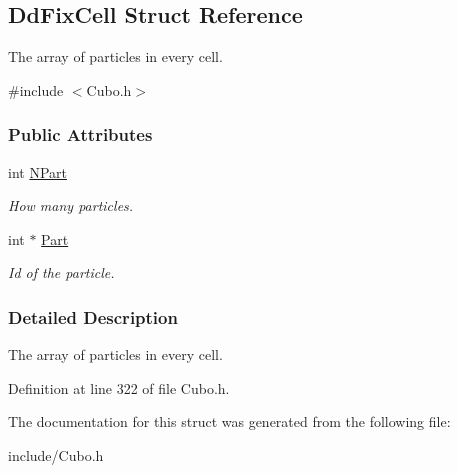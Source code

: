 \hypertarget{structDdFixCell}{}\subsection{Dd\+Fix\+Cell Struct Reference}
\label{structDdFixCell}


The array of particles in every cell.  




{\ttfamily \#include $<$Cubo.\+h$>$}

\subsubsection*{Public Attributes}
\begin{DoxyCompactItemize}
\item 
int \hyperlink{structDdFixCell_abdcc792391d8c5092471dff191de47f4}{N\+Part}\hypertarget{structDdFixCell_abdcc792391d8c5092471dff191de47f4}{}\label{structDdFixCell_abdcc792391d8c5092471dff191de47f4}

\begin{DoxyCompactList}\small\item\em How many particles. \end{DoxyCompactList}\item 
int $\ast$ \hyperlink{structDdFixCell_a9beee0152293e683562b0dccaa209270}{Part}\hypertarget{structDdFixCell_a9beee0152293e683562b0dccaa209270}{}\label{structDdFixCell_a9beee0152293e683562b0dccaa209270}

\begin{DoxyCompactList}\small\item\em Id of the particle. \end{DoxyCompactList}\end{DoxyCompactItemize}


\subsubsection{Detailed Description}
The array of particles in every cell. 

Definition at line 322 of file Cubo.\+h.



The documentation for this struct was generated from the following file\+:\begin{DoxyCompactItemize}
\item 
include/Cubo.\+h\end{DoxyCompactItemize}
